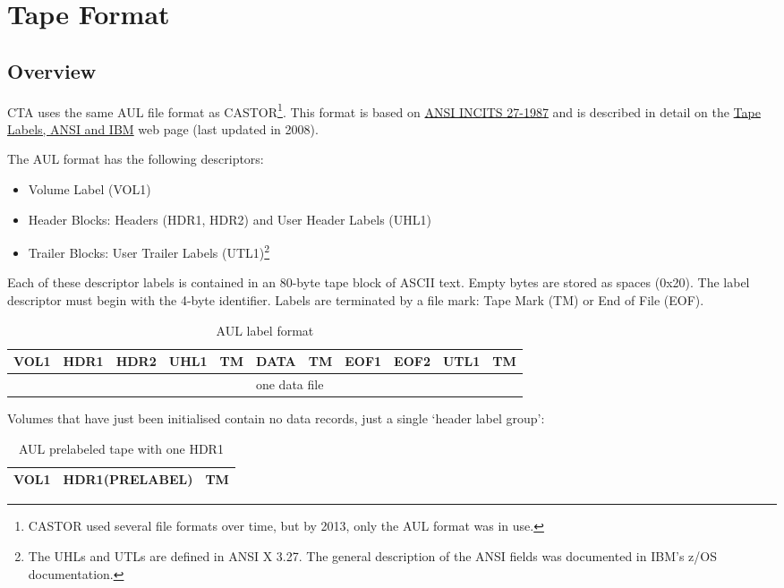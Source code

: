 \chapter{Tape Format}

\section{Overview}

CTA uses the same AUL file format as CASTOR\footnote{CASTOR used several file formats over time, but by 2013,
only the AUL format was in use.}. This format is based on
\href{http://webstore.ansi.org/RecordDetail.aspx?sku=INCITS+27-1987\%5bS2008\%5d}{ANSI INCITS 27-1987}
and is described in detail on the
\href{http://it-dep-fio-ds.web.cern.ch/it-dep-fio-ds/Documentation/tapedrive/labels.html}{Tape Labels, ANSI and IBM}
web page (last updated in 2008).

The AUL format has the following descriptors:
\begin{itemize}
\item Volume Label (VOL1)
\item Header Blocks: Headers (HDR1, HDR2) and User Header Labels (UHL1)
\item Trailer Blocks: User Trailer Labels (UTL1)\footnote{The  UHLs and UTLs are defined in ANSI X 3.27. The general
description of the ANSI fields was documented in IBM's z/OS documentation.}
\end{itemize}
Each of these descriptor labels is contained in an 80-byte tape block of ASCII text. Empty bytes are stored as spaces
(0x20). The label descriptor must begin with the 4-byte identifier. Labels are terminated by a file mark: Tape Mark (TM)
or End of File (EOF).

\begin{table}[h!]
\caption{AUL label format}
\begin{center}
\begin{tabular}{ |c|c|c|c|c|c|c|c|c|c|c| }
  \hline
  VOL1 &  \cellcolor{orange}HDR1 & \cellcolor{orange}HDR2 & \cellcolor{orange}UHL1 & \cellcolor{green} TM &
   \cellcolor{gray} DATA & \cellcolor{green} TM & \cellcolor{orange}EOF1 & \cellcolor{orange}EOF2 & 
   \cellcolor{orange}UTL1 &  \cellcolor{green} TM \\
  \hline
  \multicolumn{1}{c|}{} &\multicolumn{10}{c|}{one data file} \\
\end{tabular}
\end{center}
\end{table}
Volumes that have just been initialised contain no data records, just a single `header label group':
\begin{table}[h!]
\caption{AUL prelabeled tape with one HDR1}
\begin{center}
\begin{tabular}{ |c|c|c| }
  \hline
  VOL1 &  \cellcolor{orange}HDR1(PRELABEL)  & \cellcolor{green} TM \\
  \hline
\end{tabular}
\end{center}
\end{table}

